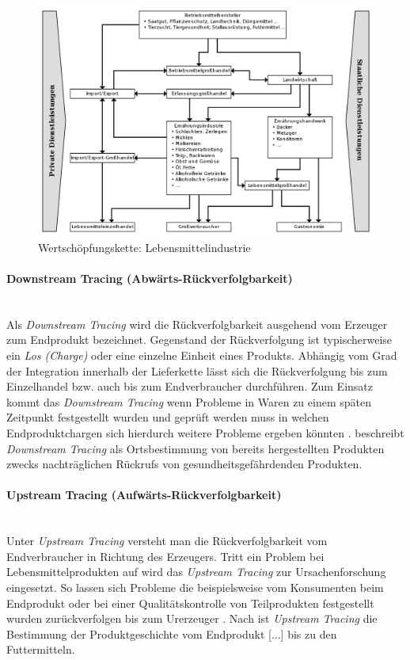 \begin{figure}[h!]
	\centering
	\includegraphics[width=1.0\linewidth]{pictures/system-of-agribusiness}
	\caption[Wertschöpfungskette: Lebensmittelindustrie]{Wertschöpfungskette: Lebensmittelindustrie \citep{Strecker2010}}
	\label{fig:wkd-Lebensmittelindustrie}
\end{figure}

\paragraph{Downstream Tracing (Abwärts-Rückverfolgbarkeit)}$~~$\\
Als \textit{Downstream Tracing} wird die Rückverfolgbarkeit ausgehend vom Erzeuger zum Endprodukt bezeichnet. Gegenstand der Rückverfolgung ist typischerweise ein \textit{Los (Charge)} oder eine einzelne Einheit eines Produkts. Abhängig vom Grad der Integration innerhalb der Lieferkette lässt sich die Rückverfolgung bis zum Einzelhandel bzw. auch bis zum Endverbraucher durchführen. Zum Einsatz kommt das \textit{Downstream Tracing} wenn Probleme in Waren zu einem späten Zeitpunkt festgestellt wurden und geprüft werden muss in welchen Endproduktchargen sich hierdurch weitere Probleme ergeben könnten \citep{Trienekens2001, Zailani2010}. \citet{Wegner-Hambloch2004} beschreibt \textit{Downstream Tracing} als \glqq Ortsbestimmung von bereits hergestellten Produkten zwecks nachträglichen Rückrufs von gesundheitsgefährdenden Produkten\grqq{}.

\paragraph{Upstream Tracing (Aufwärts-Rückverfolgbarkeit)}$~~$\\
Unter \textit{Upstream Tracing} versteht man die Rückverfolgbarkeit vom Endverbraucher in Richtung des Erzeugers. Tritt ein Problem bei Lebensmittelprodukten auf wird das \textit{Upstream Tracing} zur Ursachenforschung eingesetzt. So lassen sich Probleme die beispielsweise vom Konsumenten beim Endprodukt oder bei einer Qualitätskontrolle von Teilprodukten festgestellt wurden zurückverfolgen bis zum Urerzeuger \citep{Trienekens2001, Zailani2010}. Nach \citet{Wegner-Hambloch2004} ist \textit{Upstream Tracing} \glqq die Bestimmung der Produktgeschichte vom Endprodukt [...] bis zu den Futtermitteln.\grqq{}

